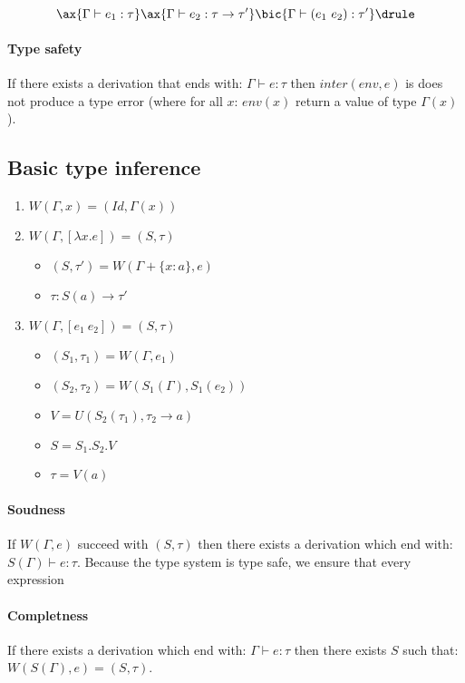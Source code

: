 \begin{equation}
\ax{\Gamma\vdash e_1:\tau}
\ax{\Gamma\vdash e_2:\tau\to\tau'}
\bic{\Gamma\vdash (e_1~e_2):\tau'}
\drule
\end{equation}

\paragraph{Type safety} If there exists a derivation that ends with: $\Gamma\vdash e:\tau$ then $inter(env,e)$ is does not produce a type error (where for all $x$: $env(x)$ return a value of type $\Gamma(x)$).

\subsection{Basic type inference}

\begin{enumerate}
\item $W(\Gamma,x)=(Id,\Gamma(x))$
\item $W(\Gamma,[\lambda x . e])=(S,\tau)$
	\begin{itemize}
	\item $(S,\tau')=W(\Gamma+\{x:a\},e)$
	\item $\tau:S(a)\to\tau'$
	\end{itemize}
\item $W(\Gamma,[e_1~e_2])=(S,\tau)$
	\begin{itemize}
	\item $(S_1,\tau_1)=W(\Gamma,e_1)$
	\item $(S_2,\tau_2)=W(S_1(\Gamma),S_1(e_2))$
	\item $V=U(S_2(\tau_1),\tau_2\to a)$
	\item $S=S_1.S_2.V$
	\item $\tau=V(a)$
	\end{itemize}
\end{enumerate}

\paragraph{Soudness} If $W(\Gamma,e)$ succeed with $(S,\tau)$ then there exists a derivation which end with: $S(\Gamma)\vdash e:\tau$. Because the type system is type safe, we ensure that every expression 

\paragraph{Completness} If there exists a derivation which end with: $\Gamma\vdash e:\tau$ then there exists $S$ such that: $W(S(\Gamma),e)=(S,\tau)$.

